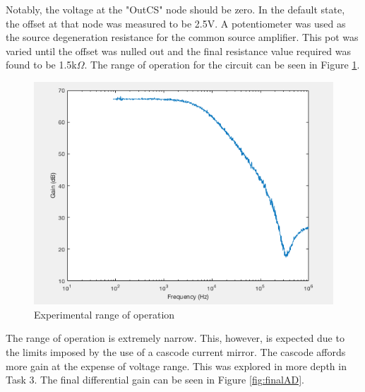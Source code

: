 Notably, the voltage at the "OutCS" node should be zero. In the default state, the offset at that node was measured to be 2.5V. A potentiometer was used as the source degeneration resistance for the common source amplifier. This pot was varied until the offset was nulled out and the final resistance value required was found to be 1.5k$\Omega$. The range of operation for the circuit can be seen in Figure \ref{fig:vtc}.


\begin{figure}[H]
	\begin{center}
		\includegraphics[scale=.40]{ExperimentalImplementation/Ad_final.png}
		\caption{Experimental range of operation}
		\label{fig:vtc}
	\end{center}
\end{figure}

The range of operation is extremely narrow. This, however, is expected due to the limits imposed by the use of a cascode current mirror. The cascode affords more gain at the expense of voltage range. This was explored in more depth in Task 3. The final differential gain can be seen in Figure \ref{fig:finalAD}.

